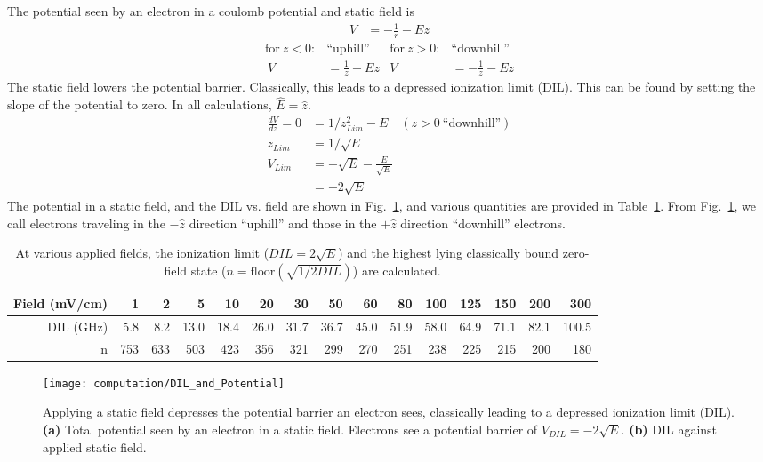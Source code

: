 \documentclass[aps,pra,preprint,groupedaddress]{revtex4-1}
\begin{document}
The potential seen by an electron in a coulomb potential and static field is 
\begin{align*}
V & = -\frac{1}{r} - Ez
\end{align*}
\begin{align*}
\text{for} ~ z < 0: & \text{``uphill''} & \text{for} ~ z > 0: & \text{``downhill''} \\\
V & = \frac{1}{z} - Ez & V & = -\frac{1}{z} - Ez
\end{align*}
The static field lowers the potential barrier. Classically, this leads to a depressed ionization limit (DIL). This can be found by setting the slope of the potential to zero. In all calculations, $\hat{E} = \hat{z}$.
\begin{align*}
\frac{dV}{dz} = 0 & = 1/z_{Lim}^2 - E \quad (z>0 ~ \text{``downhill''}) \\
z_{Lim} & = 1/\sqrt{E} \\
V_{Lim} & = -\sqrt{E} - \frac{E}{\sqrt{E}} \\
 & = -2 \sqrt{E}
\end{align*}
The potential in a static field, and the DIL vs. field are shown in Fig.~\ref{fig:DIL}, and various quantities are provided in Table~\ref{tab:DIL}. From Fig.~\ref{fig:DIL}, we call electrons traveling in the $-\hat{z}$ direction ``uphill'' and those in the $+\hat{z}$ direction ``downhill'' electrons.

\begin{table}
\caption{\label{tab:DIL} At various applied fields, the ionization limit ($DIL = 2\sqrt{E}$) and the highest lying classically bound zero-field state ($n = \text{floor}(\sqrt{1/2DIL})$) are calculated.}
\begin{ruledtabular}
\begin{tabular}{r||r|r|r|r|r|r|r|r|r|r|r|r|r|r}
Field (mV/cm) & 1 & 2 & 5 & 10 & 20 & 30 & 50 & 60 & 80 & 100 & 125 & 150 & 200 & 300 \\ \hline
DIL (GHz) & 5.8 & 8.2 & 13.0 & 18.4 & 26.0 & 31.7 & 36.7 & 45.0 & 51.9 & 58.0 & 64.9 & 71.1 & 82.1 & 100.5 \\ \hline
n & 753 & 633 & 503 & 423 & 356 & 321 & 299 & 270 & 251 & 238 & 225 & 215 & 200 & 180
\end{tabular}
\end{ruledtabular}
\end{table}

\begin{figure}
\texttt{[image: computation/DIL\_and\_Potential]}
\caption{\label{fig:DIL} Applying a static field depresses the potential barrier an electron sees, classically leading to a depressed ionization limit (DIL). \textbf{(a)} Total potential seen by an electron in a static field. Electrons see a potential barrier of $V_{DIL} = -2\sqrt{E}$. \textbf{(b)} DIL against applied static field.}
\end{figure}
\end{document}
